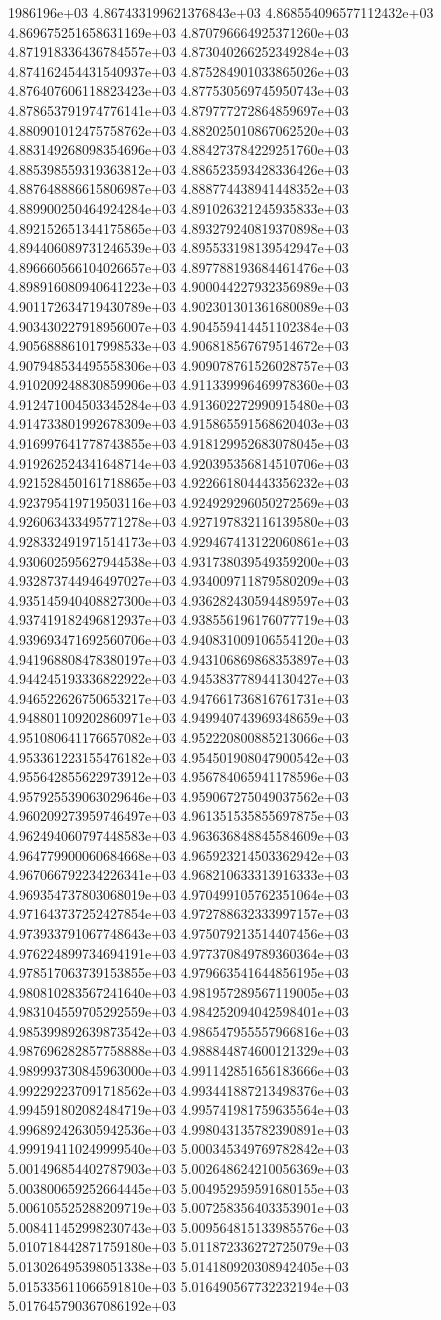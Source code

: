 1986196e+03	4.867433199621376843e+03	4.868554096577112432e+03	4.869675251658631169e+03	4.870796664925371260e+03	4.871918336436784557e+03	4.873040266252349284e+03	4.874162454431540937e+03	4.875284901033865026e+03	4.876407606118823423e+03	4.877530569745950743e+03	4.878653791974776141e+03	4.879777272864859697e+03	4.880901012475758762e+03	4.882025010867062520e+03	4.883149268098354696e+03	4.884273784229251760e+03	4.885398559319363812e+03	4.886523593428336426e+03	4.887648886615806987e+03	4.888774438941448352e+03	4.889900250464924284e+03	4.891026321245935833e+03	4.892152651344175865e+03	4.893279240819370898e+03	4.894406089731246539e+03	4.895533198139542947e+03	4.896660566104026657e+03	4.897788193684461476e+03	4.898916080940641223e+03	4.900044227932356989e+03	4.901172634719430789e+03	4.902301301361680089e+03	4.903430227918956007e+03	4.904559414451102384e+03	4.905688861017998533e+03	4.906818567679514672e+03	4.907948534495558306e+03	4.909078761526028757e+03	4.910209248830859906e+03	4.911339996469978360e+03	4.912471004503345284e+03	4.913602272990915480e+03	4.914733801992678309e+03	4.915865591568620403e+03	4.916997641778743855e+03	4.918129952683078045e+03	4.919262524341648714e+03	4.920395356814510706e+03	4.921528450161718865e+03	4.922661804443356232e+03	4.923795419719503116e+03	4.924929296050272569e+03	4.926063433495771278e+03	4.927197832116139580e+03	4.928332491971514173e+03	4.929467413122060861e+03	4.930602595627944538e+03	4.931738039549359200e+03	4.932873744946497027e+03	4.934009711879580209e+03	4.935145940408827300e+03	4.936282430594489597e+03	4.937419182496812937e+03	4.938556196176077719e+03	4.939693471692560706e+03	4.940831009106554120e+03	4.941968808478380197e+03	4.943106869868353897e+03	4.944245193336822922e+03	4.945383778944130427e+03	4.946522626750653217e+03	4.947661736816761731e+03	4.948801109202860971e+03	4.949940743969348659e+03	4.951080641176657082e+03	4.952220800885213066e+03	4.953361223155476182e+03	4.954501908047900542e+03	4.955642855622973912e+03	4.956784065941178596e+03	4.957925539063029646e+03	4.959067275049037562e+03	4.960209273959746497e+03	4.961351535855697875e+03	4.962494060797448583e+03	4.963636848845584609e+03	4.964779900060684668e+03	4.965923214503362942e+03	4.967066792234226341e+03	4.968210633313916333e+03	4.969354737803068019e+03	4.970499105762351064e+03	4.971643737252427854e+03	4.972788632333997157e+03	4.973933791067748643e+03	4.975079213514407456e+03	4.976224899734694191e+03	4.977370849789360364e+03	4.978517063739153855e+03	4.979663541644856195e+03	4.980810283567241640e+03	4.981957289567119005e+03	4.983104559705292559e+03	4.984252094042598401e+03	4.985399892639873542e+03	4.986547955557966816e+03	4.987696282857758888e+03	4.988844874600121329e+03	4.989993730845963000e+03	4.991142851656183666e+03	4.992292237091718562e+03	4.993441887213498376e+03	4.994591802082484719e+03	4.995741981759635564e+03	4.996892426305942536e+03	4.998043135782390891e+03	4.999194110249999540e+03	5.000345349769782842e+03	5.001496854402787903e+03	5.002648624210056369e+03	5.003800659252664445e+03	5.004952959591680155e+03	5.006105525288209719e+03	5.007258356403353901e+03	5.008411452998230743e+03	5.009564815133985576e+03	5.010718442871759180e+03	5.011872336272725079e+03	5.013026495398051338e+03	5.014180920308942405e+03	5.015335611066591810e+03	5.016490567732232194e+03	5.017645790367086192e+03